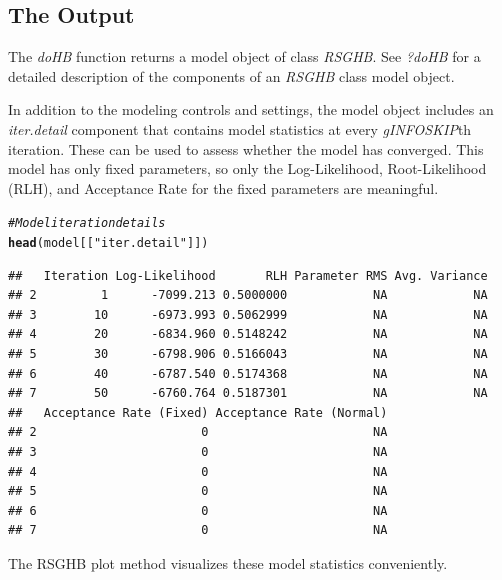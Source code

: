 \documentclass{article}\usepackage[]{graphicx}\usepackage[]{color}
\makeatletter
\newcommand{\hlstr}[1]{\textcolor[rgb]{0.192,0.494,0.8}{#1}}%
\newcommand{\hlcom}[1]{\textcolor[rgb]{0.678,0.584,0.686}{\textit{#1}}}%
\newcommand{\hlstd}[1]{\textcolor[rgb]{0.345,0.345,0.345}{#1}}%
\newcommand{\hlkwd}[1]{\textcolor[rgb]{0.737,0.353,0.396}{\textbf{#1}}}%
\newenvironment{kframe}{%
 \def\at@end@of@kframe{}%
 \ifinner\ifhmode%
  \def\at@end@of@kframe{\end{minipage}}%
  \begin{minipage}{\columnwidth}%
 \fi\fi%
 \def\FrameCommand##1{\hskip\@totalleftmargin \hskip-\fboxsep
 \colorbox{shadecolor}{##1}\hskip-\fboxsep
     \hskip-\linewidth \hskip-\@totalleftmargin \hskip\columnwidth}%
 \MakeFramed {\advance\hsize-\width
   \@totalleftmargin\z@ \linewidth\hsize
   \@setminipage}}%
 {\par\unskip\endMakeFramed%
 \at@end@of@kframe}
\newenvironment{knitrout}{}{} %
\makeatother
\begin{document}
\subsection*{The Output}

The \emph{doHB} function returns a model object of class \emph{RSGHB}. See \emph{?doHB} for a detailed description of the components of an \emph{RSGHB} class model object.

In addition to the modeling controls and settings, the model object includes an \emph{iter.detail} component that contains model statistics at every \emph{gINFOSKIP}th iteration. These can be used to assess whether the model has converged. This model has only fixed parameters, so only the Log-Likelihood, Root-Likelihood (RLH), and Acceptance Rate for the fixed parameters are meaningful.

\begin{knitrout}
\color{fgcolor}\begin{kframe}
\begin{alltt}
\hlcom{# Model iteration details}
\hlkwd{head}\hlstd{(model[[}\hlstr{"iter.detail"}\hlstd{]])}
\end{alltt}
\begin{verbatim}
##   Iteration Log-Likelihood       RLH Parameter RMS Avg. Variance
## 2         1      -7099.213 0.5000000            NA            NA
## 3        10      -6973.993 0.5062999            NA            NA
## 4        20      -6834.960 0.5148242            NA            NA
## 5        30      -6798.906 0.5166043            NA            NA
## 6        40      -6787.540 0.5174368            NA            NA
## 7        50      -6760.764 0.5187301            NA            NA
##   Acceptance Rate (Fixed) Acceptance Rate (Normal)
## 2                       0                       NA
## 3                       0                       NA
## 4                       0                       NA
## 5                       0                       NA
## 6                       0                       NA
## 7                       0                       NA
\end{verbatim}
\end{kframe}
\end{knitrout}

The RSGHB plot method visualizes these model statistics conveniently.
\end{document}
